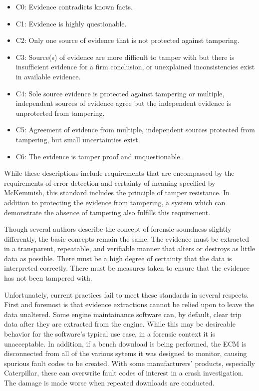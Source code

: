 \begin{itemize}
\item C0: Evidence contradicts known facts.
\item C1: Evidence is highly questionable.
\item C2: Only one source of evidence that is not protected against tampering.
\item C3: Source(s) of evidence are more difficult to tamper with but there is insufficient evidence for a firm conclusion, or unexplained inconsistencies exist in available evidence.
\item C4: Sole source evidence is protected against tampering or multiple, independent sources of evidence agree but the independent evidence is unprotected from tampering.
\item C5: Agreement of evidence from multiple, independent sources protected from tampering, but small uncertainties exist.
\item C6: The evidence is tamper proof and unquestionable.
\end{itemize}

While these descriptions include requirements that are encompassed by the requirements of error detection and certainty of meaning 
specified by McKemmish, this standard includes the principle of tamper resistance. In addition to protecting the evidence from tampering, 
a system which can demonstrate the absence of tampering also fulfills this requirement.


Though several authors describe the concept of forensic soundness slightly differently, the basic concepts remain the same. The evidence must be extracted in a transparent,
repeatable, and verifiable manner that alters or destroys as little data as possible. There must be a high degree of certainty that the data is interpreted correctly. There must
be measures taken to ensure that the evidence has not been tampered with.

Unfortunately, current practices fail to meet these standards in several respects. 
First and foremost is that evidence extractions cannot be relied upon to leave the data unaltered.
Some engine maintainance software can, by default, clear trip data after they are extracted from the engine. While this may be desireable behavior for the software's typical
use case, in a forensic context it is unacceptable. In addition, if a bench download is being performed, the ECM is disconnected from all of the various sytems it was designed to monitor,
causing spurious fault codes to be created. With some manufacturers' products, especially Caterpillar, these can overwrite fault codes of interest in a crash investigation. 
The damage is made worse when repeated downloads are conducted.

